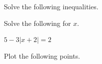 \begin{questions}
\begin{parts}
\vfill	

\end{parts}

\newpage

	


\question Solve the following inequalities.

\question[7] Solve the following for $x$.


 $5-3|x+2|=2$
	\vfill
	


\newpage

\question Plot the following points. %
\end{questions}
